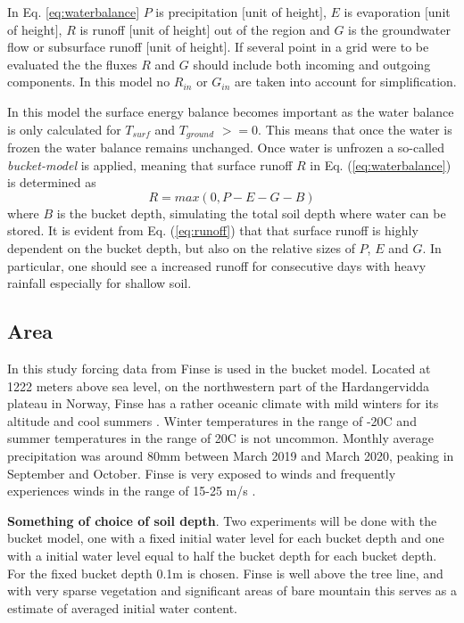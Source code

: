 \documentclass[a4paper,11pt,twocolumn]{article}
\begin{document}
In Eq. \ref{eq:waterbalance} $P$ is precipitation $[$unit of height$]$, $E$ is evaporation $[$unit of height$]$, $R$ is runoff $[$unit of height$]$ out of the region and $G$ is the groundwater flow or subsurface runoff $[$unit of height$]$. If several point in a grid were to be evaluated the the fluxes $R$ and $G$ should include both incoming and outgoing components. In this model no $R_{in}$ or $G_{in}$ are taken into account for simplification.   

In this model the surface energy balance becomes important as the water balance is only calculated for $T_{surf}$ and $T_{ground}$ $>=0$. This means that once the water is frozen the water balance remains unchanged. Once water is unfrozen a so-called \textit{bucket-model} is applied, meaning that surface runoff $R$ in Eq. (\ref{eq:waterbalance}) is determined as
\begin{equation}
	R = max(0, P-E-G-B)
	\label{eq:runoff}
\end{equation}  
where $B$ is the bucket depth, simulating the total soil depth where water can be stored. It is evident from Eq. (\ref{eq:runoff}) that that surface runoff is highly dependent on the bucket depth, but also on the relative sizes of $P$, $E$ and $G$. In particular, one should see a increased runoff for consecutive days with heavy rainfall especially for shallow soil.  

\subsection{Area}
In this study forcing data from Finse is used in the bucket model. Located at 1222 meters above sea level, on the northwestern part of the Hardangervidda plateau in Norway, Finse has a rather oceanic climate with mild winters for its altitude and cool summers \cite{finse}. Winter temperatures in the range of -20\textdegree C and summer temperatures in the range of 20\textdegree C is not uncommon. Monthly average precipitation was around 80mm between March 2019 and March 2020, peaking in September and October. Finse is very exposed to winds and frequently experiences winds in the range of 15-25 m/s \cite{yr}. 

\textbf{Something of choice of soil depth}. 
Two experiments will be done with the bucket model, one with a fixed initial water level for each bucket depth and one with a initial water level equal to half the bucket depth for each bucket depth. For the fixed bucket depth 0.1m is chosen. Finse is well above the tree line, and with very sparse vegetation and significant areas of bare mountain this serves as a estimate of averaged initial water content.     
\end{document}
